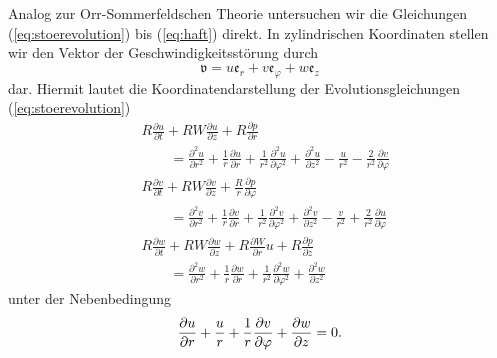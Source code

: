 \documentclass[10pt,a5paper,oneside,draft]{book}
\numberwithin{equation}{chapter}
\begin{document}
Analog zur Orr-Sommerfeldschen Theorie untersuchen wir die Gleichungen (\mbox{\ref{eq:stoerevolution}}) bis (\mbox{\ref{eq:haft}}) direkt.
In zylindrischen Koordinaten stellen wir den Vektor der Geschwindigkeitsst\"orung durch
\begin{equation}
	\mathfrak{v} = u \mathfrak{e}_r + v \mathfrak{e}_\varphi + w \mathfrak{e}_z
\end{equation}
dar.
Hiermit lautet die Koordinatendarstellung der Evolutionsgleichungen (\mbox{\ref{eq:stoerevolution}})
\begin{equation}\label{eq:evo:koord}
	\begin{split}
	& R  \frac{\partial{u}}{\partial t} + R W  \frac{\partial{u}}{\partial z} + R \frac{\partial{p}}{\partial r} \\
		&\qquad   =\frac{\partial^{2}{u}}{\partial r^2} + \frac{1}{r}  \frac{\partial{u}}{\partial r} + \frac{1}{r^2}  \frac{\partial^{2}{u}}{\partial \varphi^2} +  \frac{\partial^{2}{u}}{\partial z^2} -\frac{u}{r^2} - \frac{2}{r^2}  \frac{\partial{v}}{\partial \varphi} \\
	& R  \frac{\partial{v}}{\partial t} + R W  \frac{\partial{v}}{\partial z} + \frac{R}{r}  \frac{\partial{p}}{\partial \varphi} \\
		&\qquad  =\frac{\partial^{2}{v}}{\partial r^2} + \frac{1}{r}  \frac{\partial{v}}{\partial r} + \frac{1}{r^2}  \frac{\partial^{2}{v}}{\partial \varphi^2} +  \frac{\partial^{2}{v}}{\partial z^2} -\frac{v}{r^2} + \frac{2}{r^2}  \frac{\partial{u}}{\partial \varphi} \\
	& R  \frac{\partial{w}}{\partial t} + R W  \frac{\partial{w}}{\partial z} + R  \frac{\partial{W}}{\partial r} u + R \frac{\partial{p}}{\partial z} \\
		&\qquad  =\frac{\partial^{2}{w}}{\partial r^2} + \frac{1}{r}  \frac{\partial{w}}{\partial r} + \frac{1}{r^2}  \frac{\partial^{2}{w}}{\partial \varphi^2} +  \frac{\partial^{2}{w}}{\partial z^2}
	\end{split}	
\end{equation}
unter der Nebenbedingung
\begin{equation}
	\frac{\partial{u}}{\partial r} + \frac{u}{r} + \frac{1}{r} \frac{\partial{v}}{\partial \varphi} +  \frac{\partial{w}}{\partial z} = 0.\\
\end{equation}
\end{document}
